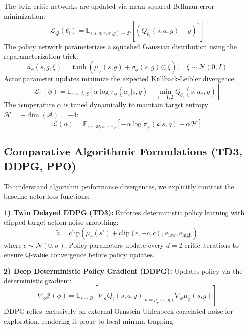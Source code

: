 \documentclass[10pt,twocolumn,a4paper]{article}
\newcommand{\E}{\mathbb{E}}
\begin{document}
The twin critic networks are updated via mean-squared Bellman error minimization:
\begin{equation}
  \mathcal{L}_Q(\theta_i) = \E_{(s, a, r, s', g) \sim \mathcal{D}} \left[ \left( Q_{\theta_i}(s, a, g) - y \right)^2 \right]
  \label{eq:critic_loss}
\end{equation}
The policy network parameterizes a squashed Gaussian distribution using the reparameterization trick:
\begin{equation}
  a_\phi(s, g, \xi) = \tanh \left( \mu_\phi(s, g) + \sigma_\phi(s, g) \odot \xi \right), \quad \xi \sim \mathcal{N}(0, I)
  \label{eq:reparameterization}
\end{equation}
Actor parameter updates minimize the expected Kullback-Leibler divergence:
\begin{equation}
  \mathcal{L}_\pi(\phi) = \E_{s \sim \mathcal{D}, \xi} \left[ \alpha \log \pi_\phi(a_\phi|s, g) - \min_{i=1,2} Q_{\theta_i}(s, a_\phi, g) \right]
  \label{eq:actor_loss}
\end{equation}
The temperature $\alpha$ is tuned dynamically to maintain target entropy $\bar{\mathcal{H}} = -\dim(\mathcal{A}) = -4$:
\begin{equation}
  \mathcal{L}(\alpha) = \E_{s \sim \mathcal{D}, a \sim \pi_\phi} \left[ -\alpha \log \pi_\phi(a|s, g) - \alpha \bar{\mathcal{H}} \right]
  \label{eq:alpha_loss}
\end{equation}

\subsection{Comparative Algorithmic Formulations (TD3, DDPG, PPO)}
To understand algorithm performance divergences, we explicitly contrast the baseline actor loss functions:

\textbf{1) Twin Delayed DDPG (TD3):} Enforces deterministic policy learning with clipped target action noise smoothing:
\begin{equation}
  \tilde{a} = \text{clip}\left( \mu_{\bar{\phi}}(s') + \text{clip}(\epsilon, -c, c), a_{\text{low}}, a_{\text{high}} \right)
  \label{eq:td3_target}
\end{equation}
where $\epsilon \sim \mathcal{N}(0, \sigma)$. Policy parameters update every $d=2$ critic iterations to ensure Q-value convergence before policy updates.

\textbf{2) Deep Deterministic Policy Gradient (DDPG):} Updates policy via the deterministic gradient:
\begin{equation}
  \nabla_\phi \mathcal{J}(\phi) = \E_{s \sim \mathcal{D}} \left[ \nabla_a Q_\theta(s, a, g)|_{a=\mu_\phi(s, g)} \nabla_\phi \mu_\phi(s, g) \right]
  \label{eq:ddpg_grad}
\end{equation}
DDPG relies exclusively on external Ornstein-Uhlenbeck correlated noise for exploration, rendering it prone to local minima trapping.
\end{document}
